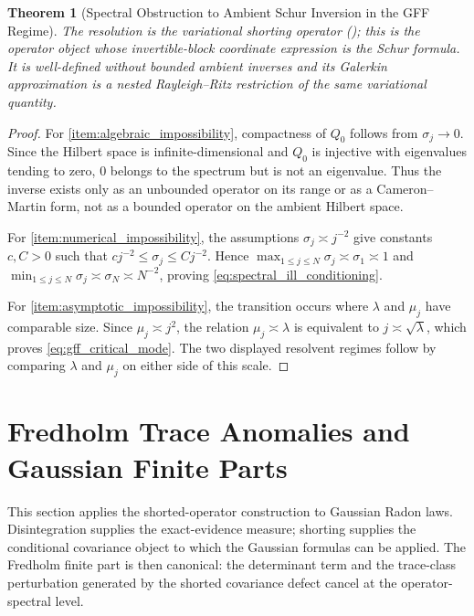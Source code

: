 \documentclass[preprint,12pt]{elsarticle}
\theoremstyle{plain}
\newtheorem{theorem}{Theorem}
\theoremstyle{definition}
\theoremstyle{remark}
\begin{document}
\begin{theorem}[Spectral Obstruction to Ambient Schur Inversion in the GFF Regime]
        The resolution is the variational shorting operator ();
        this is the operator object whose invertible-block
        coordinate expression is the Schur formula.  It is well-defined without
        bounded ambient inverses and its Galerkin approximation is a nested
        Rayleigh--Ritz restriction of the same variational quantity.
    \end{theorem}

    \begin{proof}
        For \ref{item:algebraic_impossibility}, compactness of $Q_0$ follows from
        $\sigma_j\to0$.  Since the Hilbert space is infinite-dimensional and
        $Q_0$ is injective with eigenvalues tending to zero, $0$ belongs to the
        spectrum but is not an eigenvalue.  Thus the inverse exists only as an
        unbounded operator on its range or as a Cameron--Martin form, not as a
        bounded operator on the ambient Hilbert space.

        For \ref{item:numerical_impossibility}, the assumptions
        $\sigma_j\asymp j^{-2}$ give constants $c,C>0$ such that
        $cj^{-2}\le\sigma_j\le Cj^{-2}$.  Hence
        $\max_{1\le j\le N}\sigma_j\asymp \sigma_1\asymp1$ and
        $\min_{1\le j\le N}\sigma_j\asymp\sigma_N\asymp N^{-2}$, proving
        \eqref{eq:spectral_ill_conditioning}.

        For \ref{item:asymptotic_impossibility}, the transition occurs where
        $\lambda$ and $\mu_j$ have comparable size.  Since $\mu_j\asymp j^2$,
        the relation $\mu_j\asymp\lambda$ is equivalent to
        $j\asymp\sqrt{\lambda}$, which proves \eqref{eq:gff_critical_mode}.  The
        two displayed resolvent regimes follow by comparing $\lambda$ and
        $\mu_j$ on either side of this scale.
    \end{proof}

    \section{Fredholm Trace Anomalies and Gaussian Finite Parts}
    \label{sec:gaussian_zero}

    This section applies the shorted-operator construction to Gaussian Radon
    laws.  Disintegration supplies the exact-evidence measure; shorting supplies
    the conditional covariance object to which the Gaussian formulas can be
    applied.  The Fredholm finite part is then canonical: the determinant term
    and the trace-class perturbation generated by the shorted covariance defect
    cancel at the operator-spectral level.
\end{document}
